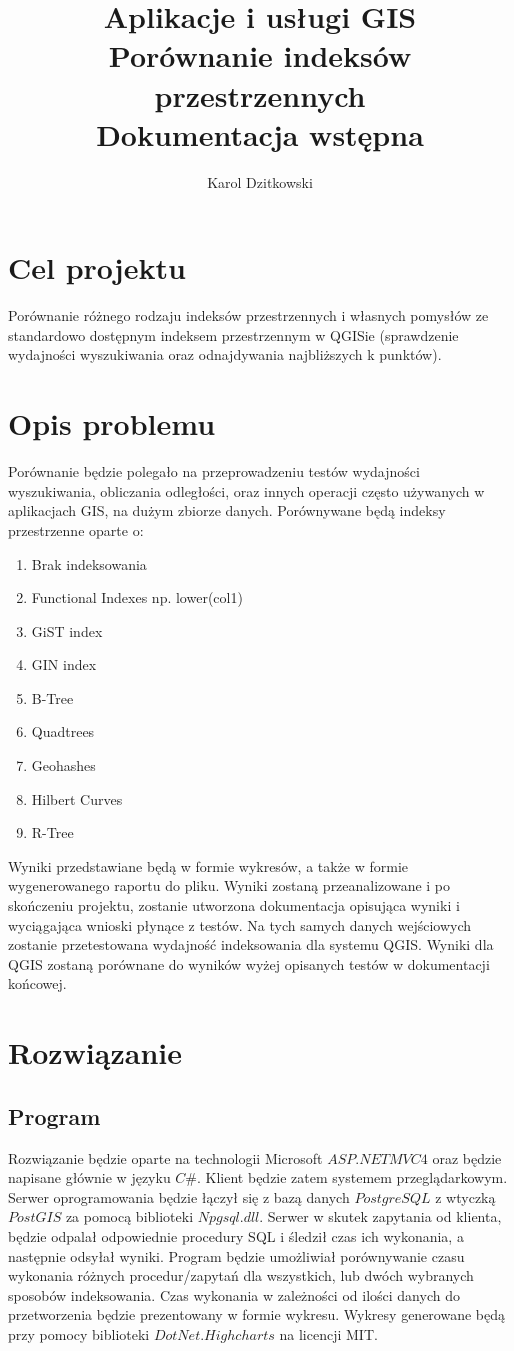 \documentclass[11pt,a4paper]{article}
\author{Karol Dzitkowski}
\title{
	Aplikacje i usługi GIS\\
	\huge{Porównanie indeksów przestrzennych}\\
 	Dokumentacja wstępna
 }
\begin{document}
\maketitle
\newpage

\tableofcontents
\newpage

\section{Cel projektu}
Porównanie różnego rodzaju indeksów przestrzennych i własnych pomysłów ze standardowo dostępnym indeksem przestrzennym w QGISie
(sprawdzenie wydajności wyszukiwania oraz odnajdywania najbliższych k punktów).
\section{Opis problemu}
Porównanie będzie polegało na przeprowadzeniu testów wydajności wyszukiwania, obliczania odległości, oraz innych operacji często
używanych w aplikacjach GIS, na dużym zbiorze danych. Porównywane będą indeksy przestrzenne oparte o:
\begin{enumerate}
	\item Brak indeksowania
	\item Functional Indexes np. lower(col1)
	\item GiST index
	\item GIN index
	\item B-Tree
	\item Quadtrees
	\item Geohashes
	\item Hilbert Curves
	\item R-Tree
\end{enumerate}
Wyniki przedstawiane będą w formie wykresów, a także w formie wygenerowanego raportu do pliku. Wyniki zostaną przeanalizowane i
po skończeniu projektu, zostanie utworzona dokumentacja opisująca wyniki i wyciągająca wnioski płynące z testów. Na tych samych danych
wejściowych zostanie przetestowana wydajność indeksowania dla systemu QGIS. Wyniki dla QGIS zostaną porównane do wyników wyżej opisanych 
testów w dokumentacji końcowej.

\section{Rozwiązanie}
\subsection{Program}
Rozwiązanie będzie oparte na technologii Microsoft $ASP.NET MVC4$ oraz będzie napisane głównie w języku $C\#$. Klient będzie zatem
systemem przeglądarkowym. Serwer oprogramowania będzie łączył się z bazą danych $PostgreSQL$ z wtyczką $PostGIS$ za pomocą biblioteki 
$Npgsql.dll$. Serwer w skutek zapytania od klienta, będzie odpalał odpowiednie procedury SQL i śledził czas ich wykonania, a następnie odsyłał wyniki. 
Program będzie umożliwiał porównywanie czasu wykonania różnych procedur/zapytań dla wszystkich, lub dwóch wybranych sposobów 
indeksowania. Czas wykonania w zależności od ilości danych do przetworzenia będzie prezentowany w formie wykresu. Wykresy 
generowane będą przy pomocy biblioteki $DotNet.Highcharts$ na licencji MIT.
\end{document}
